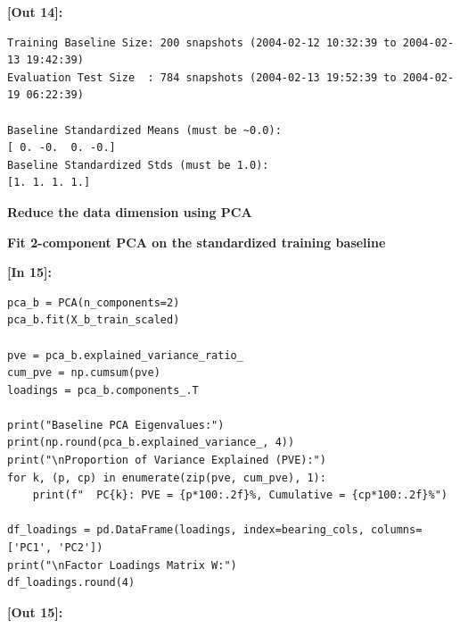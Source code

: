 \vspace{0.2em}
\noindent\textbf{\small [Out 14]:}
\begin{lstlisting}[style=output]
Training Baseline Size: 200 snapshots (2004-02-12 10:32:39 to 2004-02-13 19:42:39)
Evaluation Test Size  : 784 snapshots (2004-02-13 19:52:39 to 2004-02-19 06:22:39)

Baseline Standardized Means (must be ~0.0):
[ 0. -0.  0. -0.]
Baseline Standardized Stds (must be 1.0):
[1. 1. 1. 1.]
\end{lstlisting}
\vspace{0.5em}
\begin{tcolorbox}[colback=accentblue!8!white,colframe=accentblue!80!black,boxrule=0.7pt,arc=2pt,left=5pt,right=5pt,top=3pt,bottom=3pt,unbreakable]
{\bfseries\normalsize Reduce the data dimension using PCA\par}
\end{tcolorbox}
\vspace{0.2em}
\vspace{0.3em}
\begin{tcolorbox}[colback=gray!5!white,colframe=gray!50!black,boxrule=0.5pt,arc=2pt,left=5pt,right=5pt,top=2pt,bottom=2pt,unbreakable,before upper={\sloppy\raggedright}]
{\small\bfseries Fit 2-component PCA on the standardized training baseline\par}
\end{tcolorbox}
\vspace{0.2em}
\vspace{0.4em}
\noindent\textbf{\small [In 15]:}
\begin{lstlisting}[style=pycode]
pca_b = PCA(n_components=2)
pca_b.fit(X_b_train_scaled)

pve = pca_b.explained_variance_ratio_
cum_pve = np.cumsum(pve)
loadings = pca_b.components_.T

print("Baseline PCA Eigenvalues:")
print(np.round(pca_b.explained_variance_, 4))
print("\nProportion of Variance Explained (PVE):")
for k, (p, cp) in enumerate(zip(pve, cum_pve), 1):
    print(f"  PC{k}: PVE = {p*100:.2f}%, Cumulative = {cp*100:.2f}%")

df_loadings = pd.DataFrame(loadings, index=bearing_cols, columns=['PC1', 'PC2'])
print("\nFactor Loadings Matrix W:")
df_loadings.round(4)
\end{lstlisting}
\vspace{0.2em}
\noindent\textbf{\small [Out 15]:}
